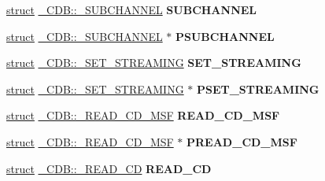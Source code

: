 \begin{DoxyCompactItemize}
\item 
\mbox{\label{union___c_d_b_a1b897e3474181020792036e4ced4dfcd}} 
\hyperlink{interfacestruct}{struct} \hyperlink{struct___c_d_b_1_1___s_u_b_c_h_a_n_n_e_l}{\+\_\+\+C\+D\+B\+::\+\_\+\+S\+U\+B\+C\+H\+A\+N\+N\+EL} {\bfseries S\+U\+B\+C\+H\+A\+N\+N\+EL}
\item 
\mbox{\label{union___c_d_b_a1c61ce0d014eb79f4c9f57fe78248fb1}} 
\hyperlink{interfacestruct}{struct} \hyperlink{struct___c_d_b_1_1___s_u_b_c_h_a_n_n_e_l}{\+\_\+\+C\+D\+B\+::\+\_\+\+S\+U\+B\+C\+H\+A\+N\+N\+EL} $\ast$ {\bfseries P\+S\+U\+B\+C\+H\+A\+N\+N\+EL}
\item 
\mbox{\label{union___c_d_b_afb0a1f8725eaaa9c8345e75dd1f49c6a}} 
\hyperlink{interfacestruct}{struct} \hyperlink{struct___c_d_b_1_1___s_e_t___s_t_r_e_a_m_i_n_g}{\+\_\+\+C\+D\+B\+::\+\_\+\+S\+E\+T\+\_\+\+S\+T\+R\+E\+A\+M\+I\+NG} {\bfseries S\+E\+T\+\_\+\+S\+T\+R\+E\+A\+M\+I\+NG}
\item 
\mbox{\label{union___c_d_b_a4f0c33459608275938f9981cc9ffa79a}} 
\hyperlink{interfacestruct}{struct} \hyperlink{struct___c_d_b_1_1___s_e_t___s_t_r_e_a_m_i_n_g}{\+\_\+\+C\+D\+B\+::\+\_\+\+S\+E\+T\+\_\+\+S\+T\+R\+E\+A\+M\+I\+NG} $\ast$ {\bfseries P\+S\+E\+T\+\_\+\+S\+T\+R\+E\+A\+M\+I\+NG}
\item 
\mbox{\label{union___c_d_b_ac0426147dd158eaac74f98292f03f5ef}} 
\hyperlink{interfacestruct}{struct} \hyperlink{struct___c_d_b_1_1___r_e_a_d___c_d___m_s_f}{\+\_\+\+C\+D\+B\+::\+\_\+\+R\+E\+A\+D\+\_\+\+C\+D\+\_\+\+M\+SF} {\bfseries R\+E\+A\+D\+\_\+\+C\+D\+\_\+\+M\+SF}
\item 
\mbox{\label{union___c_d_b_aef2605401c419d3b5b7367dffef8ab36}} 
\hyperlink{interfacestruct}{struct} \hyperlink{struct___c_d_b_1_1___r_e_a_d___c_d___m_s_f}{\+\_\+\+C\+D\+B\+::\+\_\+\+R\+E\+A\+D\+\_\+\+C\+D\+\_\+\+M\+SF} $\ast$ {\bfseries P\+R\+E\+A\+D\+\_\+\+C\+D\+\_\+\+M\+SF}
\item 
\mbox{\label{union___c_d_b_a61ba5c50bfa486ebc263a28548b39f85}} 
\hyperlink{interfacestruct}{struct} \hyperlink{struct___c_d_b_1_1___r_e_a_d___c_d}{\+\_\+\+C\+D\+B\+::\+\_\+\+R\+E\+A\+D\+\_\+\+CD} {\bfseries R\+E\+A\+D\+\_\+\+CD}
\item 

\end{DoxyCompactItemize}
